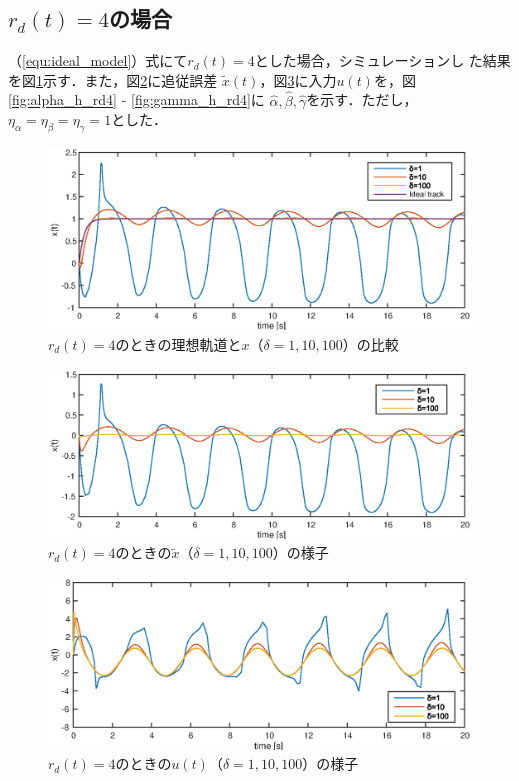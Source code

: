 \documentclass[a4paper,12pt]{jarticle}
\begin{document}
\subsection{$r_d(t)=4$の場合}
（\ref{equ:ideal_model}）式にて$r_d(t)=4$とした場合，シミュレーションし
た結果を図\ref{fig:x_rd4}示す．また，図\ref{fig:x_tilde_rd4}に追従誤差
$\tilde{x}(t)$，図\ref{fig:u_rd4}に入力$u(t)$を，図\ref{fig:alpha_h_rd4}
- \ref{fig:gamma_h_rd4}に
$\hat{\alpha},\hat{\beta},\hat{\gamma}$を示す．ただし，$\eta_\alpha=\eta_\beta=\eta_\gamma=1$とした．
%
\begin{figure}[htb]
    \begin{center}
       \includegraphics[width=140mm]{fig/x_rd4.eps}
        \caption{$r_d(t)=4$のときの理想軌道と$x$（$\delta=1,10,100$）の比較}
        \label{fig:x_rd4}
    \end{center}
\end{figure}
%
%
\begin{figure}[tb]
    \begin{center}
       \includegraphics[width=140mm]{fig/x_tilde_rd4.eps}
        \caption{$r_d(t)=4$のときの$\tilde{x}$（$\delta=1,10,100$）の様子}
        \label{fig:x_tilde_rd4}
    \end{center}
\end{figure}
%
%
\begin{figure}[htb]
    \begin{center}
       \includegraphics[width=140mm]{fig/u_rd4.eps}
        \caption{$r_d(t)=4$のときの$u(t)$（$\delta=1,10,100$）の様子}
        \label{fig:u_rd4}
    \end{center}
\end{figure}
\end{document}
